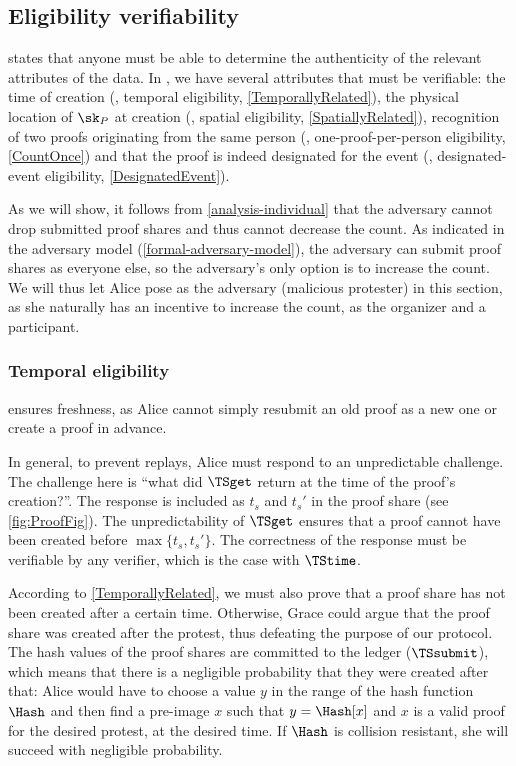 
\subsection{Eligibility verifiability}%
\label{analysis-eligibility}

 states that anyone must be able to determine the authenticity of the relevant attributes of the data.
In \CROCUS, we have several attributes that must be verifiable: the time of 
creation (\ie, temporal eligibility, \cref{TemporallyRelated}), the physical 
location of \(\sk_P\) at creation (\ie, spatial eligibility, 
\cref{SpatiallyRelated}), recognition of two proofs originating from the same 
person (\ie, one-proof-per-person eligibility, \cref{CountOnce}) and that the 
proof is indeed designated for the event (\ie, designated-event eligibility, 
\cref{DesignatedEvent}).

As we will show, it follows from \cref{analysis-individual} that the adversary 
cannot drop submitted proof shares and thus cannot decrease the count.
As indicated in the adversary model (\cref{formal-adversary-model}), the 
adversary can submit proof shares as everyone else, so the adversary's only 
option is to increase the count.
We will thus let Alice pose as the adversary (malicious protester) in this 
section, as she naturally has an incentive to increase the count, as the 
organizer and a participant.

\subsubsection{Temporal eligibility}%
\label{analysis-temporal}

 ensures freshness, as Alice cannot simply resubmit an 
old proof as a new one or create a proof in advance.

In general, to prevent replays, Alice must respond to an unpredictable 
challenge.
The challenge here is \enquote{what did \(\TSget\) return at the time of the 
  proof's creation?}.
The response is included as \(t_s\) and \(t_s'\) in the proof share (see 
\cref{fig:ProofFig}).
The unpredictability of \(\TSget\) ensures that a proof cannot have been 
created before \(\max\{t_s, t_s'\}\).
The correctness of the response must be verifiable by any verifier, which is 
the case with \(\TStime\).

According to \cref{TemporallyRelated}, we must also prove that a proof share has not been created after a certain time.
Otherwise, Grace could argue that the proof share was created after the protest, thus defeating the purpose of our protocol.
The hash values of the proof shares are committed to the ledger 
(\(\TSsubmit\)), which means that there is a negligible probability that they 
were created after that:
Alice would have to choose a value \(y\) in the range of the hash function 
\(\Hash\) and then find a pre-image \(x\) such that \(y = \Hash[x]\) and \(x\) 
is a valid proof for the desired protest, at the desired time.
If \(\Hash\) is collision resistant, she will succeed with negligible 
probability.

